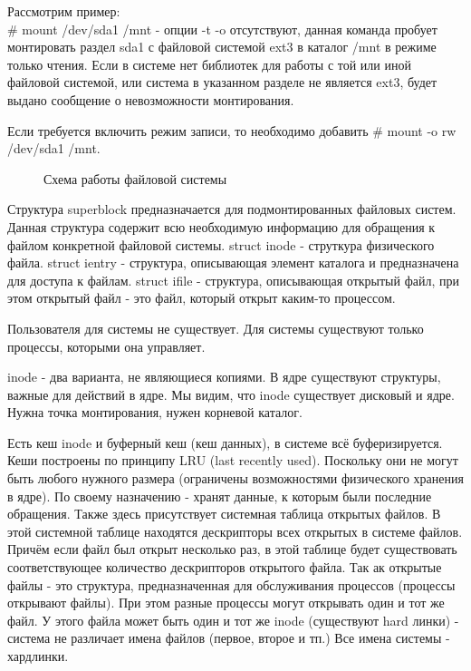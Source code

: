Рассмотрим пример:\\
\# mount /dev/sda1 /mnt - опции -t -o отсутствуют, данная команда пробует монтировать раздел sda1 с файловой системой ext3 в каталог /mnt в режиме только чтения. Если в системе нет библиотек для работы с той или иной файловой системой, или система в указанном разделе не является ext3, будет выдано сообщение о невозможности монтирования. 

Если требуется включить режим записи, то необходимо добавить \# mount -o rw /dev/sda1 /mnt.

\begin{figure}[H]
	\center{\texttt{[image: 0]}}
	\caption{Схема работы файловой системы}
\end{figure}

Структура superblock предназначается для подмонтированных файловых систем. Данная структура содержит всю необходимую информацию для обращения к файлом конкретной файловой системы. struct inode - струткура физического файла. struct ientry - структура, описывающая элемент каталога и предназначена для доступа к файлам. struct ifile - структура, описывающая открытый файл, при этом открытый файл - это файл, который открыт каким-то процессом. 

Пользователя для системы не существует. Для системы существуют только процессы, которыми она управляет. 

inode - два варианта, не являющиеся копиями. В ядре существуют структуры, важные для действий в ядре. Мы видим, что inode существует дисковый и ядре. Нужна точка монтирования, нужен корневой каталог. 

Есть кеш inode и буферный кеш (кеш данных), в системе всё буферизируется. Кеши построены по принципу LRU (last recently used). Поскольку они не могут быть любого нужного размера (ограничены возможностями физического хранения в ядре). По своему назначению - хранят данные, к которым были последние обращения. Также здесь присутствует системная таблица открытых файлов. В этой системной таблице находятся дескрипторы всех открытых в системе файлов. Причём если файл был открыт несколько раз, в этой таблице будет существовать соответствующее количество дескрипторов открытого файла. Так ак открытые файлы - это структура, предназначенная для обслуживания процессов (процессы открывают файлы). При этом разные процессы могут открывать один и тот же файл. У этого файла может быть один и тот же inode (существуют hard линки) - система не различает имена файлов (первое, второе и тп.) Все имена системы - хардлинки.

